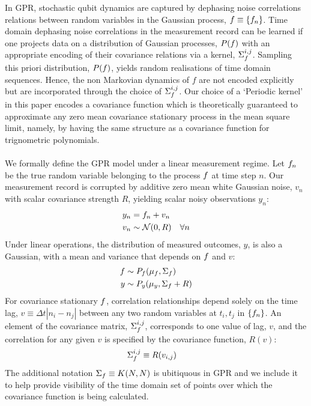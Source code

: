 In GPR, stochastic qubit dynamics are captured by dephasing noise correlations relations between random variables in the Gaussian process, $f \equiv \{f_n\}$. Time domain dephasing noise correlations in the measurement record can be learned if one projects data on a distribution of Gaussian processes, $P(f)$ with an appropriate encoding of their covariance relations via a kernel, $\Sigma_f^{i,j}$. Sampling this priori distribution, $P(f)$, yields random realisations of time domain sequences. Hence, the non Markovian dynamics of $f$ are not encoded explicitly but are incorporated through the choice of $\Sigma_f^{i,j}$. Our choice of a `Periodic kernel' in this paper encodes a covariance function which is theoretically guaranteed to approximate any zero mean covariance stationary process in the mean square limit, namely, by having the same structure as a covariance function for trignometric polynomials.
\\
\\
We formally define the GPR model under a linear measurement regime. Let $f_n$ be the true random variable belonging to the process $f$ at time step $n$. Our measurement record is corrupted by additive zero mean white Gaussian noise, $v_n$ with scalar covariance strength $R$, yielding scalar noisy observations $y_n$:
\begin{align}
y_n &= f_n + v_n \\
v_n & \sim \mathcal{N}(0, R) \quad \forall n
\end{align}
Under linear operations, the distribution of measured outcomes, $y$, is also a Gaussian, with a  mean and variance that depends on $f$ and $v$: 
\begin{align}
f & \sim P_f(\mu_f,\Sigma_f ) \\
y & \sim P_y(\mu_y,\Sigma_f + R ) 
\end{align}
For covariance stationary $f$, correlation relationships depend solely on the time lag, $v \equiv \Delta t|n_i - n_j|$ between any two random variables at $t_i, t_j$ in $\{ f_n \}$. An element of the covariance matrix, $\Sigma_f^{i,j}$, corresponds to one value of lag, $v$, and the correlation for any given $v$  is specified by the covariance function, $R(v)$:
\begin{align}
\Sigma_f^{i,j} & \equiv R(v_{i,j}) 
\end{align}
The additional notation $\Sigma_f  \equiv K(N,N)$ is ubitiquous in GPR and we include it to help provide visibility of the time domain set of points over which the covariance function is being calculated.   
